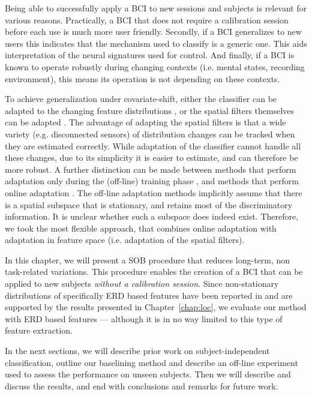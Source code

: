 Being able to successfully apply a \ac{BCI} to new sessions and subjects is
relevant for various reasons. Practically, a \ac{BCI} that does not require a
calibration session before each use is much more user friendly. Secondly, if a
\ac{BCI} generalizes to new users this indicates that the mechanism used to
classify is a generic one. This aids interpretation of the neural signatures
used for control. And finally, if a \ac{BCI} is known to operate robustly
during changing contexts (i.e. mental states, recording environment), this
means its operation is not depending on these contexts.

To achieve generalization under covariate-shift, either the classifier can be
adap\-ted to the changing feature distributions \cite{vidaurre2011tua,
shenoy2006tac}, or the spatial filters themselves can be adapted
\cite{bunau2009ssa, meinecke2009lis, tomioka2006asf, hill2006tdd, satti2010csm,
blankertz2007ics, shenoy2006tac}. The advantage of adapting the spatial filters
is that a wide variety (e.g. disconnected sensors) of distribution changes can
be tracked when they are estimated correctly. While adaptation of the
classifier cannot handle all these changes, due to its simplicity it is easier
to estimate, and can therefore be more robust.
%
A further distinction can be made between methods that perform adaptation only
during the (off-line) training phase \citep[e.g.][]{bunau2009ssa,
meinecke2009lis, blankertz2007ics}, and methods that perform online adaptation
\cite{vidaurre2011tua, tomioka2006asf, hill2006tdd, satti2010csm,
shenoy2006tac}. The off-line adaptation methods implicitly assume that there is
a spatial subspace that is stationary, and retains most of the discriminatory
information. It is unclear whether such a subspace does indeed exist.
%
Therefore, we took the most flexible approach, that combines online adaptation
with adaptation in feature space (i.e. adaptation of the spatial filters).

In this chapter, we will present a \ac{SOB} procedure that reduces long-term,
non task-related variations. This procedure enables the creation of a \ac{BCI}
that can be applied to new subjects \emph{without a calibration session}.
%
Since non-stationary distributions of specifically \ac{ERD} based features have
been reported in \cite{shenoy2006tac, blankertz2007ics, jatzev2008ecn} and are
supported by the results presented in Chapter~\ref{chap:loc}, we evaluate our
method with \ac{ERD} based features --- although it is in no way limited to
this type of feature extraction.

In the next sections, we will describe prior work on subject-independent
classification, outline our baselining method and describe an off-line
experiment used to assess the performance on unseen subjects. Then we will
describe and discuss the results, and end with conclusions and remarks for
future work.
\clearpage %






